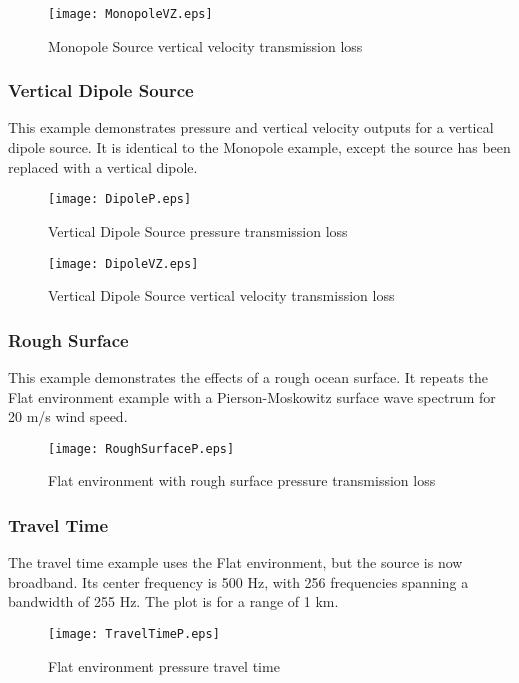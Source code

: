 \begin{figure}[!ht]
\begin{center}
\texttt{[image: MonopoleVZ.eps]}
\caption{\label{fig:MonopoleVZ}Monopole Source vertical velocity transmission loss}
\end{center}
\end{figure}

\clearpage
\subsubsection{Vertical Dipole Source}

This example demonstrates pressure and vertical velocity outputs for a vertical dipole source. It is identical to the Monopole example, except the source has been replaced with a vertical dipole.

\begin{figure}[!ht]
\begin{center}
\texttt{[image: DipoleP.eps]}
\caption{\label{fig:DipoleP}Vertical Dipole Source pressure transmission loss}
\end{center}
\end{figure}

\begin{figure}[!ht]
\begin{center}
\texttt{[image: DipoleVZ.eps]}
\caption{\label{fig:DipoleVZ}Vertical Dipole Source vertical velocity transmission loss}
\end{center}
\end{figure}

\clearpage
\subsubsection{Rough Surface}

This example demonstrates the effects of a rough ocean surface. It repeats the Flat environment example with a Pierson-Moskowitz surface wave spectrum for 20 m/s wind speed.

\begin{figure}[!ht]
\begin{center}
\texttt{[image: RoughSurfaceP.eps]}
\caption{\label{fig:RoughSurfaceP}Flat environment with rough surface pressure transmission loss}
\end{center}
\end{figure}

\clearpage
\subsubsection{Travel Time}

The travel time example uses the Flat environment, but the source is now broadband. Its center frequency is 500 Hz, with 256 frequencies spanning a bandwidth of 255 Hz. The plot is for a range of 1 km.

\begin{figure}[!ht]
\begin{center}
\texttt{[image: TravelTimeP.eps]}
\caption{\label{fig:TravelTimeP}Flat environment pressure travel time}
\end{center}
\end{figure}
